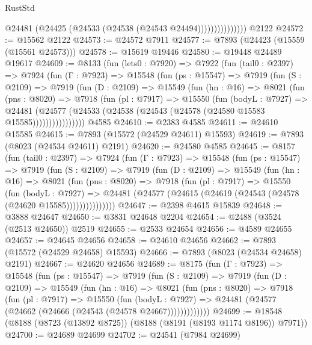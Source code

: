 \begin{lexlean}{RustStd}
\begin{coremodule}
                        @24481 (@24425 (@24533 (@24538 (@24543 @24494)))))))))))))))
    @2122
@24572 := @15562 @2122
@24573 := @24572 @7911
@24577 := @7893 (@24423 (@15559 (@15561 @24573)))
@24578 := @15619 @19446
@24580 := @19448 @24489 @19617
@24609 := @8133
    (fun (lets0 : @7920) =>
    @7922
      (fun (tail0 : @2397) =>
      @7924
        (fun (Γ : @7923) =>
        @15548
          (fun (ps : @15547) =>
          @7919
            (fun (S : @2109) =>
            @7919
              (fun (D : @2109) =>
              @15549
                (fun (hn : @16) =>
                @8021
                  (fun (pns : @8020) =>
                  @7918
                    (fun (pl : @7917) =>
                    @15550
                      (fun (bodyL : @7927) =>
                      @24481
                        (@24577
                          (@24533 (@24538 (@24543 (@24578 (@24580 @15583 @15585))))))))))))))))
    @4585
@24610 := @2383 @4585
@24611 := @24610 @15585
@24615 := @7893 (@15572 (@24529 @24611) @15593)
@24619 := @7893 (@8023 (@24534 @24611) @2191)
@24620 := @24580 @4585
@24645 := @8157
    (fun (tail0 : @2397) =>
    @7924
      (fun (Γ : @7923) =>
      @15548
        (fun (ps : @15547) =>
        @7919
          (fun (S : @2109) =>
          @7919
            (fun (D : @2109) =>
            @15549
              (fun (hn : @16) =>
              @8021
                (fun (pns : @8020) =>
                @7918
                  (fun (pl : @7917) =>
                  @15550
                    (fun (bodyL : @7927) =>
                    @24481 (@24577 (@24615 (@24619 (@24543 (@24578 (@24620 @15585)))))))))))))))
@24647 := @2398 @4615 @15839
@24648 := @3888 @24647
@24650 := @3831 @24648 @2204
@24654 := @2488 (@3524 (@2513 @24650)) @2519
@24655 := @2533 @24654
@24656 := @4589 @24655
@24657 := @24645 @24656
@24658 := @24610 @24656
@24662 := @7893 (@15572 (@24529 @24658) @15593)
@24666 := @7893 (@8023 (@24534 @24658) @2191)
@24667 := @24620 @24656
@24689 := @8175
    (fun (Γ : @7923) =>
    @15548
      (fun (ps : @15547) =>
      @7919
        (fun (S : @2109) =>
        @7919
          (fun (D : @2109) =>
          @15549
            (fun (hn : @16) =>
            @8021
              (fun (pns : @8020) =>
              @7918
                (fun (pl : @7917) =>
                @15550
                  (fun (bodyL : @7927) =>
                  @24481 (@24577 (@24662 (@24666 (@24543 (@24578 @24667)))))))))))))
@24699 := @18548 (@8188 (@8723 (@13892 @8725)) (@8188 (@8191 (@8193 @1174 @8196)) @7971))
@24700 := @24689 @24699
@24702 := @24541 (@7984 @24699)

\end{coremodule}
\end{lexlean}
